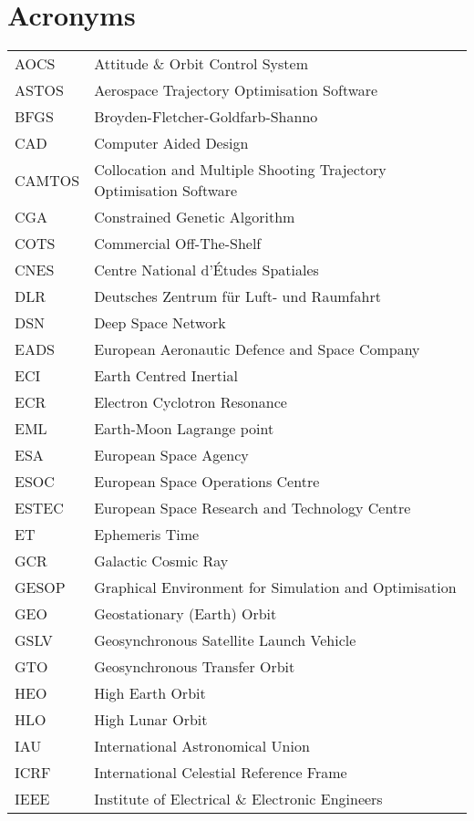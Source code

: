 \section*{Acronyms}

\begin{longtable}{l p{}}

AOCS & Attitude \& Orbit Control System \\
ASTOS & Aerospace Trajectory Optimisation Software \\
BFGS & Broyden-Fletcher-Goldfarb-Shanno \\
CAD & Computer Aided Design \\
CAMTOS & Collocation and Multiple Shooting Trajectory Optimisation Software \\
CGA & Constrained Genetic Algorithm \\
COTS & Commercial Off-The-Shelf \\
CNES & Centre National d'\'{E}tudes Spatiales \\
DLR & Deutsches Zentrum f\"{u}r Luft- und Raumfahrt \\
DSN & Deep Space Network \\
EADS & European Aeronautic Defence and Space Company \\
ECI & Earth Centred Inertial \\
ECR & Electron Cyclotron Resonance \\
EML & Earth-Moon Lagrange point \\
ESA & European Space Agency \\
ESOC & European Space Operations Centre \\
ESTEC &  European Space Research and Technology Centre \\
ET & Ephemeris Time \\
GCR & Galactic Cosmic Ray \\
GESOP & Graphical Environment for Simulation and Optimisation \\
GEO & Geostationary (Earth) Orbit \\
GSLV & Geosynchronous Satellite Launch Vehicle \\
GTO & Geosynchronous Transfer Orbit \\
HEO & High Earth Orbit \\
HLO & High Lunar Orbit \\
IAU & International Astronomical Union \\
ICRF & International Celestial Reference Frame \\
IEEE & Institute of Electrical \& Electronic Engineers \\

\end{longtable}

